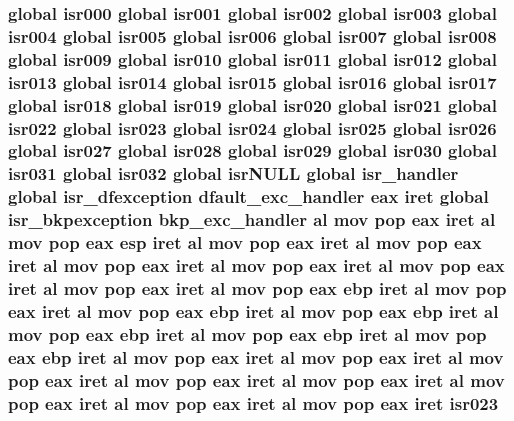 \subsubsection[{\texorpdfstring{isr023}{isr023}}]{\setlength{\rightskip}{0pt plus 5cm}global {\bf isr000} global {\bf isr001} global {\bf isr002} global {\bf isr003} global {\bf isr004} global {\bf isr005} global {\bf isr006} global {\bf isr007} global {\bf isr008} global {\bf isr009} global {\bf isr010} global {\bf isr011} global {\bf isr012} global {\bf isr013} global {\bf isr014} global {\bf isr015} global {\bf isr016} global {\bf isr017} global {\bf isr018} global {\bf isr019} global {\bf isr020} global {\bf isr021} global {\bf isr022} global isr023 global {\bf isr024} global {\bf isr025} global {\bf isr026} global {\bf isr027} global {\bf isr028} global {\bf isr029} global {\bf isr030} global {\bf isr031} global isr032 global isr\+N\+U\+LL global isr\+\_\+handler global {\bf isr\+\_\+dfexception} {\bf dfault\+\_\+exc\+\_\+handler} eax iret global {\bf isr\+\_\+bkpexception} {\bf bkp\+\_\+exc\+\_\+handler} {\bf al} {\bf mov} pop eax iret {\bf al} {\bf mov} pop eax esp iret {\bf al} {\bf mov} pop eax iret {\bf al} {\bf mov} pop eax iret {\bf al} {\bf mov} pop eax iret {\bf al} {\bf mov} pop eax iret {\bf al} {\bf mov} pop eax iret {\bf al} {\bf mov} pop eax iret {\bf al} {\bf mov} pop eax ebp iret {\bf al} {\bf mov} pop eax iret {\bf al} {\bf mov} pop eax ebp iret {\bf al} {\bf mov} pop eax ebp iret {\bf al} {\bf mov} pop eax ebp iret {\bf al} {\bf mov} pop eax ebp iret {\bf al} {\bf mov} pop eax ebp iret {\bf al} {\bf mov} pop eax iret {\bf al} {\bf mov} pop eax iret {\bf al} {\bf mov} pop eax iret {\bf al} {\bf mov} pop eax iret {\bf al} {\bf mov} pop eax iret {\bf al} {\bf mov} pop eax iret {\bf al} {\bf mov} pop eax iret {\bf al} {\bf mov} pop eax iret isr023}\hypertarget{isrs_8as_a1bfa9db2a388c5d2d7a131d981707afc}{}\label{isrs_8as_a1bfa9db2a388c5d2d7a131d981707afc}
